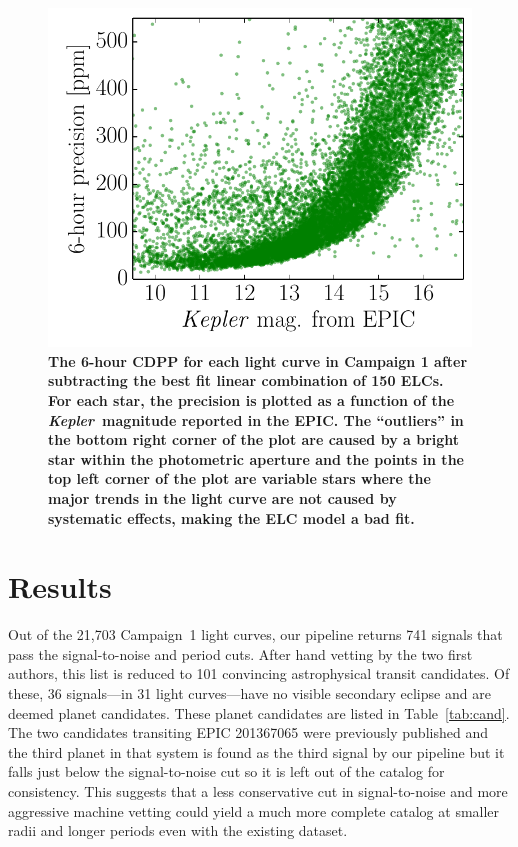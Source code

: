 \documentclass[12pt,preprint]{aastex}
\newcommand{\project}[1]{\textsl{#1}} %
\newcommand{\kepler}{\project{Kepler}}
\newcommand{\figlabel}[1]{\label{fig:#1}}
\newcommand{\Tab}[1]{Table~\ref{tab:#1}}
\newcommand{\tab}[1]{\Tab{#1}}
\newcommand{\sectlabel}[1]{\label{sect:#1}}
\newcommand{\response}[1]{{\color{mygreen} {\bf #1}}}
\begin{document}
\begin{figure}[p]
\begin{center}
\includegraphics{figures/performance.pdf}
\end{center}
\caption{%
\response{%
The 6-hour CDPP \citep{Christiansen:2012} for each light curve in Campaign 1
after subtracting the best fit linear combination of 150 ELCs.
For each star, the precision is plotted as a function of the \kepler\
magnitude reported in the EPIC.
The ``outliers'' in the bottom right corner of the plot are caused by a
bright star within the photometric aperture and the points in the top left
corner of the plot are variable stars where the major trends in the light
curve are not caused by systematic effects, making the ELC model a bad fit.}
\figlabel{performance}}
\end{figure}


\section{Results}
\sectlabel{results}

Out of the 21,703 Campaign~1 light curves, our pipeline returns 741 signals
that pass the signal-to-noise and period cuts.
After hand vetting by the two first authors, this list is reduced to 101
convincing astrophysical transit candidates.
Of these, 36 signals---in 31 light curves---have no visible secondary
eclipse and are deemed planet candidates.
These planet candidates are listed in \tab{cand}.
The two candidates transiting EPIC 201367065 were previously published
\citep{Crossfield:2015} and the third planet in that system is found as the
third signal by our pipeline but it falls just below the signal-to-noise cut
so it is left out of the catalog for consistency.
This suggests that a less conservative cut in signal-to-noise and more
aggressive machine vetting could yield a much more complete catalog at smaller
radii and longer periods even with the existing dataset.
\end{document}
